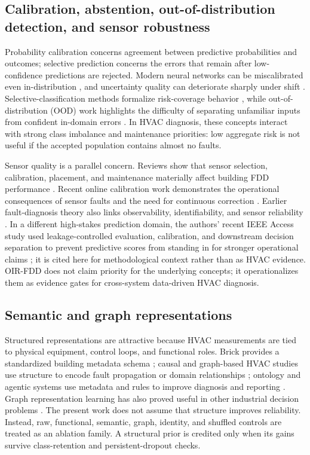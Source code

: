 \documentclass[preprint,12pt]{elsarticle}
\begin{document}
\subsection{Calibration, abstention, out-of-distribution detection, and sensor robustness}
Probability calibration concerns agreement between predictive probabilities and outcomes; selective prediction concerns the errors that remain after low-confidence predictions are rejected. Modern neural networks can be miscalibrated even in-distribution \cite{guo2017calibration}, and uncertainty quality can deteriorate sharply under shift \cite{ovadia2019uncertainty}. Selective-classification methods formalize risk-coverage behavior \cite{geifman2017selective,geifman2019selectivenet}, while out-of-distribution (OOD) work highlights the difficulty of separating unfamiliar inputs from confident in-domain errors \cite{hendrycks2017ood}. In HVAC diagnosis, these concepts interact with strong class imbalance and maintenance priorities: low aggregate risk is not useful if the accepted population contains almost no faults.

Sensor quality is a parallel concern. Reviews show that sensor selection, calibration, placement, and maintenance materially affect building FDD performance \cite{zhang2021sensor,hu2025sensorreview}. Recent online calibration work demonstrates the operational consequences of sensor faults and the need for continuous correction \cite{li2025voting}. Earlier fault-diagnosis theory also links observability, identifiability, and sensor reliability \cite{bhushan2000,yang2009}. In a different high-stakes prediction domain, the authors' recent IEEE Access study used leakage-controlled evaluation, calibration, and downstream decision separation to prevent predictive scores from standing in for stronger operational claims \cite{tseng2026access}; it is cited here for methodological context rather than as HVAC evidence. OIR-FDD does not claim priority for the underlying concepts; it operationalizes them as evidence gates for cross-system data-driven HVAC diagnosis.

\subsection{Semantic and graph representations}
Structured representations are attractive because HVAC measurements are tied to physical equipment, control loops, and functional roles. Brick provides a standardized building metadata schema \cite{balaji2016brick}; causal and graph-based HVAC studies use structure to encode fault propagation or domain relationships \cite{zhang2022causal,ghalamsiah2026graph}; ontology and agentic systems use metadata and rules to improve diagnosis and reporting \cite{li2026agentic}. Graph representation learning has also proved useful in other industrial decision problems \cite{liu2024gat,liu2025hgnn}. The present work does not assume that structure improves reliability. Instead, raw, functional, semantic, graph, identity, and shuffled controls are treated as an ablation family. A structural prior is credited only when its gains survive class-retention and persistent-dropout checks.
\end{document}
